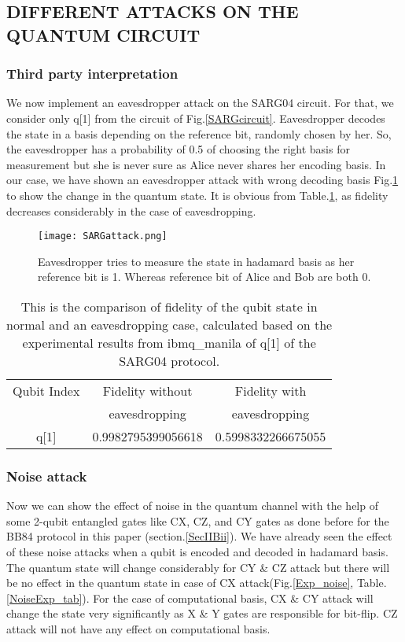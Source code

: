 \documentclass[superscriptaddress,twocolumn,showpacs,prb,floatfix]{revtex4}
\begin{document}
\subsection{DIFFERENT ATTACKS ON THE QUANTUM CIRCUIT}
\label{SecIIIB}

\subsubsection{Third party interpretation}
\label{SecIIIBi}
We now implement an eavesdropper attack on the SARG04 circuit. For that, we consider only q[1] from the circuit of Fig.\ref{SARGcircuit}. Eavesdropper decodes the state in a basis depending on the reference bit, randomly chosen by her. So, the eavesdropper has a probability of 0.5 of choosing the right basis for measurement but she is never sure as Alice never shares her encoding basis. In our case, we have shown an eavesdropper attack with wrong decoding basis Fig.\ref{SARGattack} to show the change in the quantum state. It is obvious from Table.\ref{Fid_SARG_attack}, as fidelity decreases considerably in the case of eavesdropping. 

\begin{figure}[H]
    \centering
    \texttt{[image: SARGattack.png]}
    \caption{Eavesdropper tries to measure the state in hadamard basis as her reference bit is 1. Whereas reference bit of Alice and Bob are both 0.  }
    \label{SARGattack}
\end{figure}

\begin{table}[ht]
    \centering
    \begin{tabular}{|c|c|c|}
    \hline
    \hline
    Qubit Index & Fidelity without & Fidelity with \\ & eavesdropping & eavesdropping \\ [0.5ex]
    \hline
     q[1] & 0.9982795399056618  & 0.5998332266675055 \\ [0.5ex]
    \hline
    \end{tabular}
    \caption{This is the comparison of fidelity of the qubit state in normal and an eavesdropping case, calculated based on the experimental results from ibmq\_manila of q[1] of the SARG04 protocol.}
    \label{Fid_SARG_attack}
\end{table}
\subsubsection{Noise attack}
\label{SecIIIBii}
Now we can show the effect of noise in the quantum channel with the help of some 2-qubit entangled gates like CX, CZ, and CY gates as done before for the BB84 protocol in this paper (section.\ref{SecIIBii}). We have already seen the effect of these noise attacks when a qubit is encoded and decoded in hadamard basis. The quantum state will change considerably for CY \& CZ attack but there will be no effect in the quantum state in case of CX attack(Fig.\ref{Exp_noise}, Table.\ref{NoiseExp_tab}). For the case of computational basis, CX \& CY attack will change the state very significantly as X \& Y gates are responsible for bit-flip. CZ attack will not have any effect on computational basis. 
\end{document}
